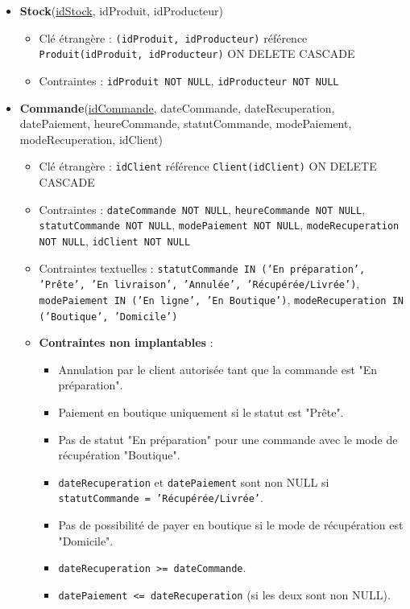 \begin{itemize}
    \item \textbf{Stock}(\underline{idStock}, idProduit, idProducteur)
    \begin{itemize}
        \item Clé étrangère : \texttt{(idProduit, idProducteur)} référence \texttt{Produit(idProduit, idProducteur)} ON DELETE CASCADE
        \item Contraintes : \texttt{idProduit NOT NULL}, \texttt{idProducteur NOT NULL}
    \end{itemize}
    
    \item \textbf{Commande}(\underline{idCommande}, dateCommande, dateRecuperation, datePaiement, heureCommande, statutCommande, modePaiement, modeRecuperation, idClient)
    \begin{itemize}
        \item Clé étrangère : \texttt{idClient} référence \texttt{Client(idClient)} ON DELETE CASCADE
        \item Contraintes : \texttt{dateCommande NOT NULL}, \texttt{heureCommande NOT NULL}, \texttt{statutCommande NOT NULL}, \texttt{modePaiement NOT NULL}, \texttt{modeRecuperation NOT NULL}, \texttt{idClient NOT NULL}
        \item Contraintes textuelles : \texttt{statutCommande IN ('En préparation', 'Prête', 'En livraison', 'Annulée', 'Récupérée/Livrée')}, \texttt{modePaiement IN ('En ligne', 'En Boutique')}, \texttt{modeRecuperation IN ('Boutique', 'Domicile')}
        \item \textbf{Contraintes non implantables} :
        \begin{itemize}
            \item Annulation par le client autorisée tant que la commande est "En préparation".
            \item Paiement en boutique uniquement si le statut est "Prête".
            \item Pas de statut "En préparation" pour une commande avec le mode de récupération "Boutique".
            \item \texttt{dateRecuperation} et \texttt{datePaiement} sont non NULL si \texttt{statutCommande = 'Récupérée/Livrée'}.
            \item Pas de possibilité de payer en boutique si le mode de récupération est "Domicile".
            \item \texttt{dateRecuperation >= dateCommande}.
            \item \texttt{datePaiement <= dateRecuperation} (si les deux sont non NULL).
        \end{itemize}
    \end{itemize}
    

\end{itemize}
